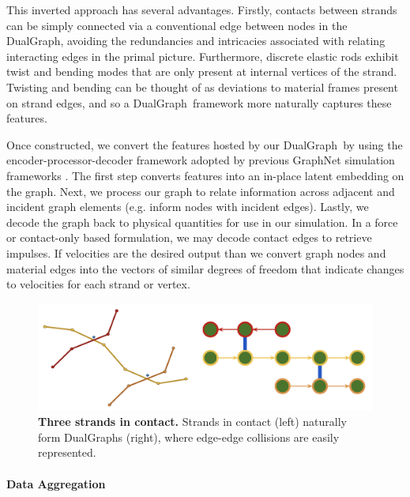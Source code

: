 \documentclass[12pt]{report}
\newcommand{\hn}{DualGraph}
\begin{document}
This inverted approach has several advantages. Firstly, contacts
between strands can be simply connected via a conventional edge between nodes
in the \hn, avoiding the redundancies and intricacies associated with relating
interacting edges in the primal picture.
Furthermore, discrete elastic rods exhibit twist and bending modes that are
only present at internal vertices of the strand.
Twisting and bending can be thought of as deviations to material frames
present on strand edges, and so a \hn~framework more naturally captures these
features.

Once constructed, we convert the features hosted by our 
\hn~by using the encoder-processor-decoder framework adopted by previous 
GraphNet simulation frameworks \cite{pfaff2021learning, sanchezgonzalez2020learning,sanchezgonzalez2018inferencecontrol}.
The first step converts features into an in-place latent embedding on the graph.
Next, we process our graph to relate information across adjacent and incident
graph elements (e.g. inform nodes with incident edges).
Lastly, we decode the graph back to physical quantities for use in our simulation.
In a force or contact-only based formulation, we may decode contact edges to retrieve
impulses.
If velocities are the desired output than we convert graph nodes and material edges
into the vectors of similar degrees of freedom that indicate changes to velocities
for each strand or vertex.

\begin{figure}[H]
    \centering
    \vspace{-2mm}
    \includegraphics[width=0.8\linewidth]{figs/dualContact.png}
    \caption{\textbf{Three strands in contact.}
    Strands in contact (left) naturally form \hn s (right), where edge-edge collisions are easily  represented.
    \label{fig:dual_contact}}
\end{figure}

\paragraph{Data Aggregation}
\end{document}
